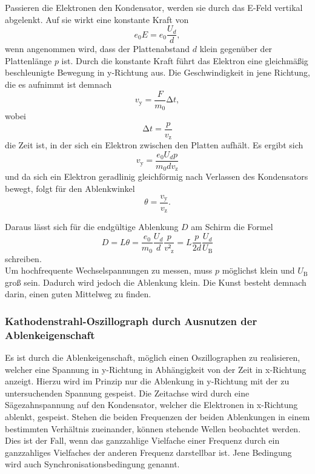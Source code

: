 Passieren die Elektronen den Kondensator, werden sie durch das E-Feld vertikal abgelenkt.
Auf sie wirkt eine konstante Kraft von
\begin{equation}
  e_0 E = e_0 \frac{U_{d}}{d},
\end{equation}
wenn angenommen wird, dass der Plattenabstand $d$ klein gegenüber der Plattenlänge $p$ ist.
Durch die konstante Kraft führt das Elektron eine gleichmäßig beschleunigte Bewegung in y-Richtung aus.
Die Geschwindigkeit in jene Richtung, die es aufnimmt ist demnach
\begin{equation}
  v_{\text{y}} = \frac{F}{m_0} \increment{t},
\end{equation}
wobei
\begin{equation}
  \increment{t} = \frac{p}{v_{\text{z}}}
\end{equation}
die Zeit ist, in der sich ein Elektron zwischen den Platten aufhält.
Es ergibt sich
\begin{equation}
  v_{\text{y}} = \frac{e_0 U_d p}{m_0 d v_{\text{z}}}
\end{equation}
und da sich ein Elektron geradlinig gleichförmig nach Verlassen des Kondensators bewegt, folgt für den Ablenkwinkel
\begin{equation}
  \theta = \frac{v_{\text{y}}}{v_{\text{z}}}.
\end{equation}

Daraus lässt sich für die endgültige Ablenkung $D$ am Schirm die Formel
\begin{equation}
  D = L \theta = \frac{e_0}{m_0} \frac{U_d}{d} \frac{p}{v²_{\text{z}}} = L \frac{p}{2d} \frac{U_d}{U_{\text{B}}} \label{eqn:2}
\end{equation}
schreiben.\\
Um hochfrequente Wechselspannungen zu messen, muss $p$ möglichst klein und $U_{\text{B}}$ groß sein.
Dadurch wird jedoch die Ablenkung klein.
Die Kunst besteht demnach darin, einen guten Mittelweg zu finden.

\subsubsection{Kathodenstrahl-Oszillograph durch Ausnutzen der Ablenkeigenschaft}
Es ist durch die Ablenkeigenschaft, möglich einen Oszillographen zu realisieren, welcher eine Spannung in y-Richtung in Abhängigkeit von der Zeit in x-Richtung anzeigt.
Hierzu wird im Prinzip nur die Ablenkung in y-Richtung mit der zu untersuchenden Spannung gespeist.
Die Zeitachse wird durch eine Sägezahnspannung auf den Kondensator, welcher die Elektronen in x-Richtung ablenkt, gespeist.
Stehen die beiden Frequenzen der beiden Ablenkungen in einem bestimmten Verhältnis zueinander, können stehende Wellen beobachtet werden.
Dies ist der Fall, wenn das ganzzahlige Vielfache einer Frequenz durch ein ganzzahliges Vielfaches der anderen Frequenz darstellbar ist.
Jene Bedingung wird auch Synchronisationsbedingung genannt.


